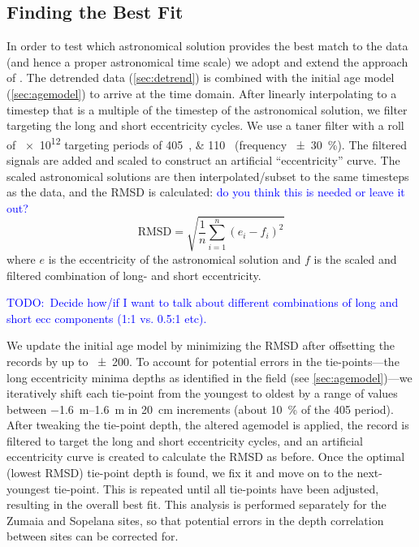 \documentclass[draft]{agujournal2019}
\newcommand{\ijk}{\textcolor{blue}}
\begin{document}
\subsection{Finding the Best Fit}\label{sec:algorithm}

In order to test which astronomical solution provides the best match to the data
(and hence a proper astronomical time scale)
we adopt and extend the approach of .
The detrended data (\cref{sec:detrend}) is combined with the initial age model (\cref{sec:agemodel}) to arrive at the time domain.
After linearly interpolating to a timestep that is a multiple of the timestep of the astronomical solution, we filter targeting the long and short eccentricity cycles.
We use a taner filter with a roll of \num{e12} targeting periods of \qtylist{405;110}{\kiloyear} (frequency \qty{\pm30}{\percent}).
The filtered signals are added and scaled to construct an artificial ``eccentricity'' curve.
The scaled astronomical solutions are then interpolated/subset to the same timesteps as the data, and the \gls{RMSD} is calculated:
\ijk{do you think this is needed or leave it out?}
\begin{equation}\label{eqn:rmsd}
    \text{RMSD} = \sqrt{\frac{1}{n}\sum_{i=1}^{n}(e_{i} - f_{i})^{2}}
\end{equation}
where \(e\) is the eccentricity of the astronomical solution and \(f\) is the scaled and filtered combination of long- and short eccentricity.

\ijk{TODO:\ Decide how/if I want to talk about different combinations of long and short ecc components (1:1 vs. 0.5:1 etc).}

We update the initial age model by minimizing the \gls{RMSD} after offsetting the records by up to \qty{\pm200}{\kiloyear}.
To account for potential errors in the tie-points---the long eccentricity minima depths as identified in the field (see \cref{sec:agemodel})---we iteratively shift each tie-point from the youngest to oldest by a range of values between \qtyrange[range-phrase=~to~]{-1.6}{1.6}{\metre} in \qty{20}{\centi\metre} increments (about \qty{10}{\percent} of the \qty{405}{\kiloyear} period).
After tweaking the tie-point depth, the altered agemodel is applied, the record is filtered to target the long and short eccentricity cycles, and an artificial eccentricity curve is created to calculate the \gls{RMSD} as before.
Once the optimal (lowest \gls{RMSD}) tie-point depth is found, we fix it and move on to the next-youngest tie-point.
This is repeated until all tie-points have been adjusted, resulting in the overall best fit.
This analysis is performed separately for the Zumaia and Sopelana sites, so that potential errors in the depth correlation between sites can be corrected for.
\end{document}
